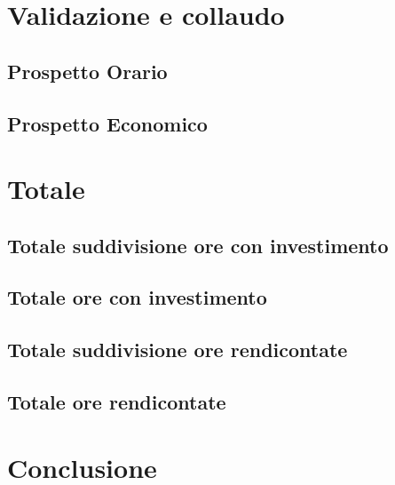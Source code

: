 \documentclass[PianoDiProgetto.tex]{subfiles}
\begin{document}
\section{Validazione e collaudo}
\subsection{Prospetto Orario}
\subsection{Prospetto Economico}

\section{Totale}
\subsection{Totale suddivisione ore con investimento}
\subsection{Totale ore con investimento}
\subsection{Totale suddivisione ore rendicontate}
\subsection{Totale ore rendicontate}

\section{Conclusione}
\end{document}
